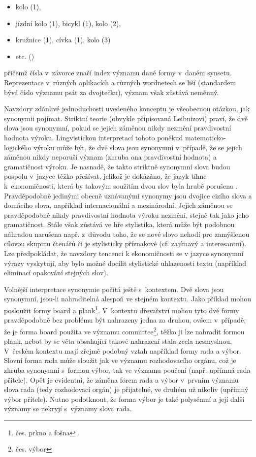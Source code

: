 \documentclass[a4paper, 11pt, oneside, showtrims]{book}
\newcommand\ex{\textsf}
\begin{document}
					\begin{itemize}
						\item \ex{kolo (1)},
						\item \ex{jízdní kolo (1), bicykl (1), kolo (2)},
						\item \ex{kružnice (1), cívka (1), kolo (3)}
						\item[] etc. (\textcite{pala2004building})
					\end{itemize}

					přičemž čísla v~závorce značí index významu dané formy v~daném synsetu. Reprezentace v~různých aplikacích a různých wordnetech se liší (standardem bývá číslo významu psát za dvojtečku), význam však zůstává neměnný. 

					Navzdory zdánlivé jednoduchosti uvedeného konceptu je všeobecnou otázkou, jak synonymii pojímat. Striktní teorie (obvykle připisovaná Leibnizovi) praví, že dvě slova jsou synonymní, pokud se jejich záměnou nikdy nezmění pravdivostní hodnota výroku. Lingvistickou interpretací tohoto poněkud matematicko-logického výroku může být, že dvě slova jsou synonymní v~případě, že se jejich záměnou nikdy neporuší význam (zhruba ona pravdivostní hodnota) a gramatičnost výroku. Je nasnadě, že takto striktně synonymní slova budou pospolu v~jazyce těžko přežívat, jelikož je dokázáno, že jazyk tíhne k~ekonomičnosti, která by takovým soužitím dvou slov byla hrubě porušena \parencite{Lotko2003}. Pravděpodobně jedinými obecně uznávanými synonymy jsou dvojice cizího slova a domácího slova, například \ex{internacionální} a \ex{mezinárodní}. Jejich záměnou se pravděpodobně nikdy pravdivostní hodnota výroku nezmění, stejně tak jako jeho gramatičnost. Stále však zůstává ve hře stylistika, která může být podobnou náhradou narušena např. z~důvodu toho, že se nové slovo nehodí pro zamýšlenou cílovou skupinu čtenářů či je stylisticky příznakové (cf. \ex{zajímavý} a \ex{interesantní}). Lze předpokládat, že navzdory tencenci k ekonomičnosti se v jazyce synonymní výrazy vyskytují, aby bylo možné docílit stylistické uhlazenosti textu (například eliminací opakování stejných slov).

					Volnější interpretace synonymie počítá ještě s~kontextem. Dvě slova jsou synonymní, jsou-li nahraditelná alespoň ve stejném kontextu. Jako příklad mohou posloužit formy \ex{board} a \ex{plank}\footnote{čes. \ex{prkno} a \ex{fošna}}. V~kontextu dřevařství mohou tyto dvě formy pravděpodobně bez problému být nahrazeny jedna za druhou, ovšem v~případě, že je forma \ex{board} použita ve významu \ex{committee}\footnote{čes. \ex{výbor}}, těžko ji lze nahradit formou \ex{plank}, neboť by se věta obsahující takové nahrazení stala zcela nesmyslnou. \parencite{miller1990introduction} V~českém kontextu mají zřejmě podobný vztah například formy \ex{rada} a \ex{výbor}. Slovní forma \ex{rada} může sloužit jak ve významu rozhodovacího orgánu, což je zhruba synonymní s~formou \ex{výbor}, tak ve významu poučení (např. \ex{upřímná rada přítele}). Opět je evidentní, že záměna forem \ex{rada} a \ex{výbor} v~prvním významu slova \ex{rada} (tedy rozhodovací orgán) je přijatelné, ve druhém už nikoliv (\ex{upřímný výbor přítele}). Nutno podotknout, že forma \ex{výbor} je také polysémní a její další významy se nekryjí s~významy slova \ex{rada}. \parencite{Havranek1989}
\end{document}
